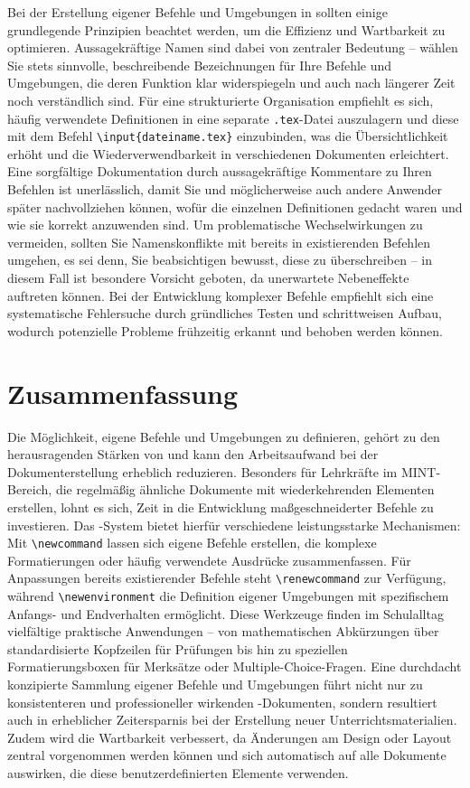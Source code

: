 Bei der Erstellung eigener Befehle und Umgebungen in  sollten einige grundlegende Prinzipien beachtet werden, um die Effizienz und Wartbarkeit zu optimieren. Aussagekräftige Namen sind dabei von zentraler Bedeutung – wählen Sie stets sinnvolle, beschreibende Bezeichnungen für Ihre Befehle und Umgebungen, die deren Funktion klar widerspiegeln und auch nach längerer Zeit noch verständlich sind. Für eine strukturierte Organisation empfiehlt es sich, häufig verwendete Definitionen in eine separate \texttt{.tex}-Datei auszulagern und diese mit dem Befehl \texttt{\textbackslash input\{dateiname.tex\}} einzubinden, was die Übersichtlichkeit erhöht und die Wiederverwendbarkeit in verschiedenen Dokumenten erleichtert. Eine sorgfältige Dokumentation durch aussagekräftige Kommentare zu Ihren Befehlen ist unerlässlich, damit Sie und möglicherweise auch andere Anwender später nachvollziehen können, wofür die einzelnen Definitionen gedacht waren und wie sie korrekt anzuwenden sind. Um problematische Wechselwirkungen zu vermeiden, sollten Sie Namenskonflikte mit bereits in  existierenden Befehlen umgehen, es sei denn, Sie beabsichtigen bewusst, diese zu überschreiben – in diesem Fall ist besondere Vorsicht geboten, da unerwartete Nebeneffekte auftreten können. Bei der Entwicklung komplexer Befehle empfiehlt sich eine systematische Fehlersuche durch gründliches Testen und schrittweisen Aufbau, wodurch potenzielle Probleme frühzeitig erkannt und behoben werden können.

\section{Zusammenfassung}

Die Möglichkeit, eigene Befehle und Umgebungen zu definieren, gehört zu den herausragenden Stärken von  und kann den Arbeitsaufwand bei der Dokumenterstellung erheblich reduzieren. Besonders für Lehrkräfte im MINT-Bereich, die regelmäßig ähnliche Dokumente mit wiederkehrenden Elementen erstellen, lohnt es sich, Zeit in die Entwicklung maßgeschneiderter Befehle zu investieren. Das -System bietet hierfür verschiedene leistungsstarke Mechanismen: Mit \texttt{\textbackslash newcommand} lassen sich eigene Befehle erstellen, die komplexe Formatierungen oder häufig verwendete Ausdrücke zusammenfassen. Für Anpassungen bereits existierender Befehle steht \texttt{\textbackslash renewcommand} zur Verfügung, während \texttt{\textbackslash newenvironment} die Definition eigener Umgebungen mit spezifischem Anfangs- und Endverhalten ermöglicht. Diese Werkzeuge finden im Schulalltag vielfältige praktische Anwendungen – von mathematischen Abkürzungen über standardisierte Kopfzeilen für Prüfungen bis hin zu speziellen Formatierungsboxen für Merksätze oder Multiple-Choice-Fragen. Eine durchdacht konzipierte Sammlung eigener Befehle und Umgebungen führt nicht nur zu konsistenteren und professioneller wirkenden -Dokumenten, sondern resultiert auch in erheblicher Zeitersparnis bei der Erstellung neuer Unterrichtsmaterialien. Zudem wird die Wartbarkeit verbessert, da Änderungen am Design oder Layout zentral vorgenommen werden können und sich automatisch auf alle Dokumente auswirken, die diese benutzerdefinierten Elemente verwenden.

